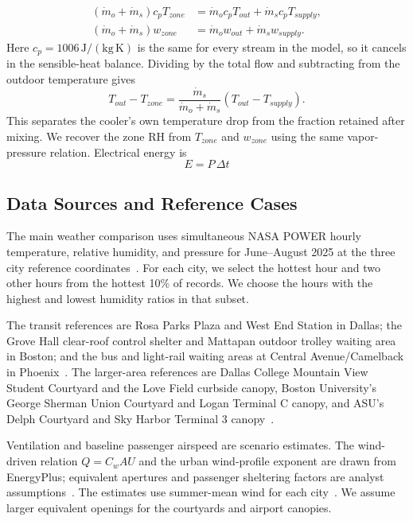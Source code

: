 \begin{align}
(\dot m_o+\dot m_s)c_p T_{zone}
 &= \dot m_o c_p T_{out}+\dot m_s c_p T_{supply},\\
(\dot m_o+\dot m_s)w_{zone}
 &= \dot m_o w_{out}+\dot m_s w_{supply}.
\end{align}
Here $c_p=1006\,\mathrm{J/(kg\,K)}$ is the same for every stream in the model, so it cancels in the sensible-heat balance. Dividing by the total flow and subtracting from the outdoor temperature gives
\begin{equation}
 T_{out}-T_{zone}
 = \frac{\dot m_s}{\dot m_o+\dot m_s}(T_{out}-T_{supply}).
\end{equation}
This separates the cooler's own temperature drop from the fraction retained after mixing. We recover the zone RH from $T_{zone}$ and $w_{zone}$ using the same vapor-pressure relation. Electrical energy is
\begin{equation}
E = P\,\Delta t
\end{equation}
 

\subsection{Data Sources and Reference Cases}\label{sec:reference-cases}
The main weather comparison uses simultaneous NASA POWER hourly temperature, relative humidity, and pressure for June--August 2025 at the three city reference coordinates~\cite{nasa_hourly_summer_2025}. For each city, we select the hottest hour and two other hours from the hottest 10\% of records. We choose the hours with the highest and lowest humidity ratios in that subset.

The transit references are Rosa Parks Plaza and West End Station in Dallas; the Grove Hall clear-roof control shelter and Mattapan outdoor trolley waiting area in Boston; and the bus and light-rail waiting areas at Central Avenue/Camelback in Phoenix~\cite{dart_rosa,dart_west,boston_shade,bwa_mattapan,valley_bus,valley_rail}. The larger-area references are Dallas College Mountain View Student Courtyard and the Love Field curbside canopy, Boston University's George Sherman Union Courtyard and Logan Terminal C canopy, and ASU's Delph Courtyard and Sky Harbor Terminal 3 canopy~\cite{dallas_college_student_courtyard,dal_lovefield_canopy,bu_gsu_courtyard,bos_logan_canopy,asu_delph_courtyard,phx_skyharbor_canopy}.

Ventilation and baseline passenger airspeed are scenario estimates. The wind-driven relation $Q=C_w A U$ and the urban wind-profile exponent are drawn from EnergyPlus; equivalent apertures and passenger sheltering factors are analyst assumptions~\cite{energyplus_wind_ventilation,energyplus_242_surface}. The estimates use summer-mean wind for each city~\cite{nasa_2026_dallas_summer,nasa_2026_boston_summer,nasa_2026_phoenix_summer}. We assume larger equivalent openings for the courtyards and airport canopies.

